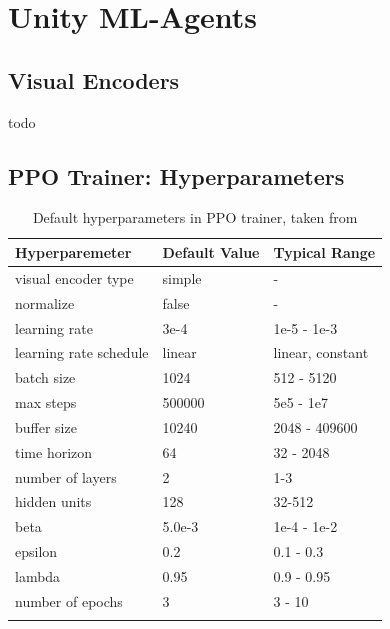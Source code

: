 
\newpage
\section{Unity ML-Agents}\label{appendix:mlagents}

\subsection{Visual Encoders}\label{appendix:visual-encoders}
todo 

\subsection{PPO Trainer: Hyperparameters}\label{appendix:ppo-trainer}

\begin{longtable}{@{} p{3.5cm} p{2.5cm} p{2.5cm} @{}} \toprule
\textbf{Hyperparemeter}       & \textbf{Default Value} & \textbf{Typical Range} \\ \midrule
visual encoder type         & simple    & - \\ 
normalize                   & false     & - \\
learning rate               & 3e-4      & 1e-5 - 1e-3 \\ 
learning rate schedule      & linear    & linear, constant \\ 
batch size                  &  1024     & 512 - 5120 \\
max steps                   &  500000   & 5e5 - 1e7 \\ 
buffer size                 & 10240     & 2048 - 409600 \\ 
time horizon                &  64       & 32 - 2048  \\
number of layers            &  2        & 1-3 \\
hidden units                &  128      & 32-512 \\
beta                        &  5.0e-3   & 1e-4 - 1e-2  \\
epsilon                     &  0.2      & 0.1 - 0.3  \\
lambda                      &  0.95     & 0.9 - 0.95  \\
number of epochs            & 3         & 3 - 10 \\ \bottomrule
\caption{Default hyperparameters in PPO trainer, taken from \cite{github-unity-mlagents-toolkit}} \label{tab:default-hyperparameters}
\end{longtable}


